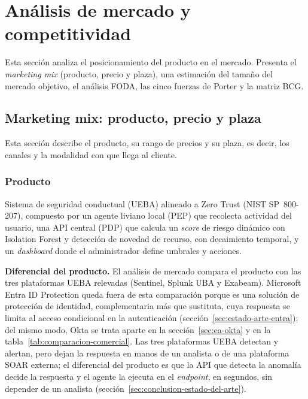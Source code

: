 \chapter{Análisis de mercado y competitividad}
\label{chap:mercado}

Esta sección analiza el posicionamiento del producto en el mercado. Presenta el \emph{marketing mix} (producto, precio y plaza), una estimación del tamaño del mercado objetivo, el análisis FODA, las cinco fuerzas de Porter y la matriz BCG.

\section{Marketing mix: producto, precio y plaza}\label{sec:marketing-mix}

Esta sección describe el producto, su rango de precios y su plaza, es decir, los canales y la modalidad con que llega al cliente.

\subsection{Producto}
Sistema de seguridad conductual (UEBA) alineado a Zero Trust (NIST SP~800-207), compuesto por un agente liviano local (PEP) que recolecta actividad del usuario, una API central (PDP) que calcula un \emph{score} de riesgo dinámico con Isolation Forest y detección de novedad de recurso, con decaimiento temporal, y un \emph{dashboard} donde el administrador define umbrales y acciones.

\noindent\textbf{Diferencial del producto.} El análisis de mercado compara el producto con las tres plataformas UEBA relevadas (Sentinel, Splunk UBA y Exabeam). Microsoft Entra ID Protection queda fuera de esta comparación porque es una solución de protección de identidad, complementaria más que sustituta, cuya respuesta se limita al acceso condicional en la autenticación (sección~\ref{sec:estado-arte-entra}); del mismo modo, Okta se trata aparte en la sección~\ref{sec:ea-okta} y en la tabla~\ref{tab:comparacion-comercial}. Las tres plataformas UEBA detectan y alertan, pero dejan la respuesta en manos de un analista o de una plataforma SOAR externa; el diferencial del producto es que la API que detecta la anomalía decide la respuesta y el agente la ejecuta en el \emph{endpoint}, en segundos, sin depender de un analista (sección~\ref{sec:conclusion-estado-del-arte}).


